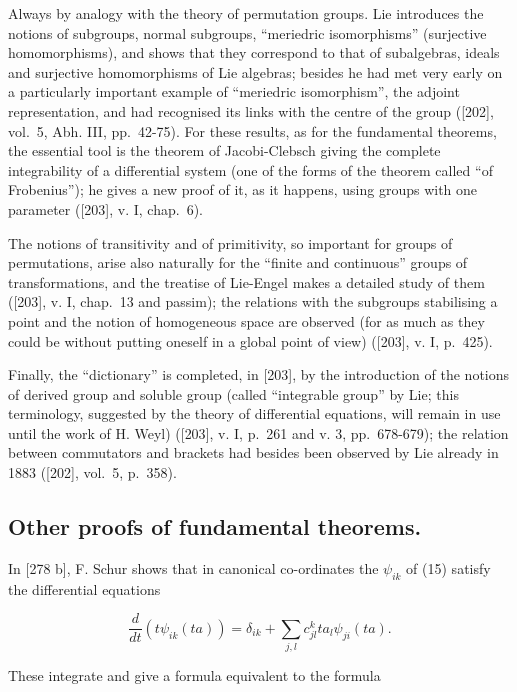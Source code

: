 Always by analogy with the theory of permutation groups. Lie introduces the notions of subgroups, normal subgroups, ``meriedric isomorphisms'' (surjective homomorphisms), and shows that they correspond to that of subalgebras, ideals and surjective homomorphisms of Lie algebras; besides he had met very early on a particularly important example of ``meriedric isomorphism'', the adjoint representation, and had recognised its links with the centre of the group ({[}202{]}, vol.~5, Abh. III, pp.~42-75). For these results, as for the fundamental theorems, the essential tool is the theorem of Jacobi-Clebsch giving the complete integrability of a differential system (one of the forms of the theorem called ``of Frobenius''); he gives a new proof of it, as it happens, using groups with one parameter ({[}203{]}, v. I, chap.~6).

The notions of transitivity and of primitivity, so important for groups of permutations, arise also naturally for the ``finite and continuous'' groups of transformations, and the treatise of Lie-Engel makes a detailed study of them ({[}203{]}, v. I, chap.~13 and passim); the relations with the subgroups stabilising a point and the notion of homogeneous space are observed (for as much as they could be without putting oneself in a global point of view) ({[}203{]}, v. I, p.~425).

Finally, the ``dictionary'' is completed, in {[}203{]}, by the introduction of the notions of derived group and soluble group (called ``integrable group'' by Lie; this terminology, suggested by the theory of differential equations, will remain in use until the work of H. Weyl) ({[}203{]}, v. I, p.~261 and v. 3, pp.~678-679); the relation between commutators and brackets had besides been observed by Lie already in 1883 ({[}202{]}, vol.~5, p.~358).

\subsection*{Other proofs of fundamental theorems.}
{}

In {[}278 b{]}, F. Schur shows that in canonical co-ordinates the \(\psi_{ik}\) of (15) satisfy the differential equations

\[
\frac {d}{d t} (t \psi_ {i k} (t a)) = \delta_ {i k} + \sum_ {j, l} c _ {j l} ^ {k} t a _ {l} \psi_ {j i} (t a).\tag{25.23}
\]

These integrate and give a formula equivalent to the formula

